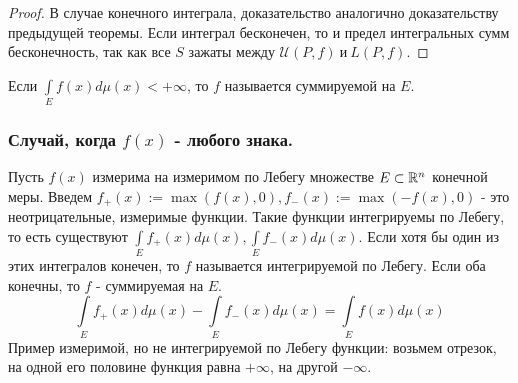 \begin{proof}
В случае конечного интеграла, доказательство аналогично доказательству предыдущей теоремы. Если интеграл бесконечен, то и предел интегральных сумм бесконечность, так как все $S$ зажаты между $\mathcal{U}(P, f) \:\text{и} \:L(P, f)$.
\end{proof}

\begin{Def}
Если $\int\limits_E f(x)d\mu(x) < +\infty$, то $f$ называется суммируемой на $E$.
\end{Def}

\subsubsection{Случай, когда $f(x)$ - любого знака.}
Пусть $f(x)$ измерима на измеримом по Лебегу множестве $E \subset \R^n$ конечной меры. Введем $f_+(x):=\max(f(x), 0), f_-(x):=\max(-f(x), 0)$ - это неотрицательные, измеримые функции. Такие функции интегрируемы по Лебегу, то есть существуют $\int\limits_E f_+(x)d\mu(x), \int\limits_E f_-(x)d\mu(x)$. Если хотя бы один из этих интегралов конечен, то $f$ называется интегрируемой по Лебегу. Если оба конечны, то $f$ - суммируемая на $E$.
$$\int\limits_E f_+(x)d\mu(x)- \int\limits_E f_-(x)d\mu(x) = \int\limits_E f(x)d\mu(x)$$
Пример измеримой, но не интегрируемой по Лебегу функции: возьмем отрезок, на одной его половине функция равна $+\infty$, на другой $-\infty$.



